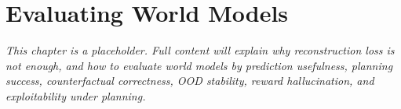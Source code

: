 \chapter{Evaluating World Models}
\label{ch:evaluating-world-models}


\textit{This chapter is a placeholder. Full content will explain why reconstruction loss is not enough, and how to evaluate world models by prediction usefulness, planning success, counterfactual correctness, OOD stability, reward hallucination, and exploitability under planning.}
